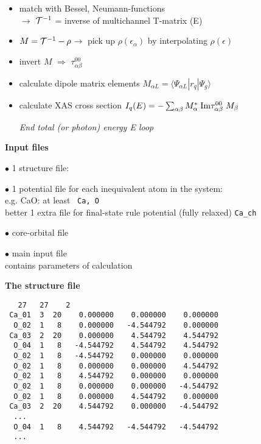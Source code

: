 \documentclass[landscape]{slides}
\newcommand{\page}{\end{slide}\begin{slide}}
\begin{document}
\begin{slide}
\begin{itemize}
\item match with Bessel, Neumann-functions\\
$\rightarrow$ 
${\cal T}^{-1}$ = inverse of multichannel T-matrix (E)

\item
$M = {\cal T}^{-1} -\rho$\quad $\rightarrow$ pick up $\rho(\epsilon_\alpha)$ by interpolating $\rho(\epsilon)$

\item invert $M$ \quad $\Rightarrow$ \quad $\tau^{00}_{\alpha\beta}$

\item
calculate dipole matrix elements $M_{\alpha L}=\langle \Psi_{\alpha L}|r_q|\Psi_g \rangle$ 

\item
calculate XAS cross section \quad 
$I_q(E) = -\sum_{\alpha\beta} M_\alpha^*\; {\rm Im} \tau^{00}_{\alpha\beta}\; M_\beta$  

{\it End total (or photon) energy E loop}
\end{itemize}








\page
{\bf Input files}

$\bullet$ 1 structure file: 


$\bullet$ 1 potential file for each inequivalent atom in the system:\\
e.g. CaO: at least \ {\tt Ca, O}\\
better 1 extra file for final-state rule potential (fully relaxed)
{\tt Ca\_ch}

$\bullet$ core-orbital file

$\bullet$ main input file \\
contains parameters of calculation


\page
{\bf The structure file}  

\begin{small}
\begin{verbatim}
   27   27    2
 Ca_01  3  20    0.000000    0.000000    0.000000
  O_02  1   8    0.000000   -4.544792    0.000000
 Ca_03  2  20    0.000000    4.544792    4.544792
  O_04  1   8   -4.544792    4.544792    4.544792
  O_02  1   8   -4.544792    0.000000    0.000000
  O_02  1   8    0.000000    0.000000    4.544792
  O_02  1   8    4.544792    0.000000    0.000000
  O_02  1   8    0.000000    0.000000   -4.544792
  O_02  1   8    0.000000    4.544792    0.000000
 Ca_03  2  20    4.544792    0.000000   -4.544792
  ...
  O_04  1   8    4.544792   -4.544792   -4.544792
  ...
\end{verbatim}
\end{small}


\end{slide}
\end{document}
